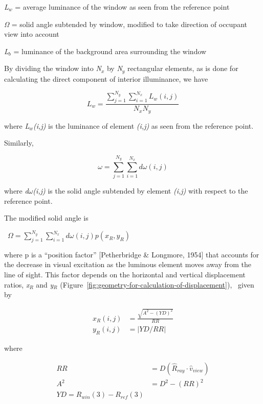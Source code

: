 \emph{L\(_{w}\)} = average luminance of the window as seen from the reference point

\emph{Ω} = solid angle subtended by window, modified to take direction of occupant view into account

\emph{L\(_{b}\)} = luminance of the background area surrounding the window

By dividing the window into \emph{N\(_{x}\)} by \emph{N\(_{y}\)} rectangular elements, as is done for calculating the direct component of interior illuminance, we have

\begin{equation}
{L_w} = \frac{{\sum\limits_{j = 1}^{{N_y}} {\sum\limits_{i = 1}^{{N_x}} {{L_w}(i,j)} } }}{{{N_x}{N_y}}}
\end{equation}

where \emph{L\(_{w}\)(i,j)} is the luminance of element \emph{(i,j)} as seen from the reference point.

Similarly,

\begin{equation}
\omega  = \sum\limits_{j = 1}^{{N_y}} {\sum\limits_{i = 1}^{{N_x}} {d\omega (i,j)} }
\end{equation}

where \emph{d$\omega$(i,j)} is the solid angle subtended by element \emph{(i,j)} with respect to the reference point.

The modified solid angle is

~\(\Omega = \sum\limits_{j = 1}^{{N_y}} {\sum\limits_{i = 1}^{{N_x}} {d\omega (i,j)} } p({x_R},{y_R})\)

where p is a ``position factor'' {[}Petherbridge \& Longmore, 1954{]} that accounts for the decrease in visual excitation as the luminous element moves away from the line of sight. This factor depends on the horizontal and vertical displacement ratios, \emph{x\(_{R}\)} and \emph{y\(_{R}\)} (Figure~\ref{fig:geometry-for-calculation-of-displacement}),~ given by

\begin{equation}
\begin{array}{rl}
    x_R(i,j) & = \frac{\sqrt{A^2-(YD)^2}}{RR} \\
    y_R(i,j) & = \left|YD/RR\right|
\end{array}
\end{equation}

where

\begin{equation}
\begin{array}{rl}
    RR & = D (\hat{R}_{ray}\cdot\hat{v}_{view}) \\
    A^2 & = D^2 - (RR)^2 \\
    YD = R_{win}(3) - R_{ref}(3)
\end{array}
\end{equation}

